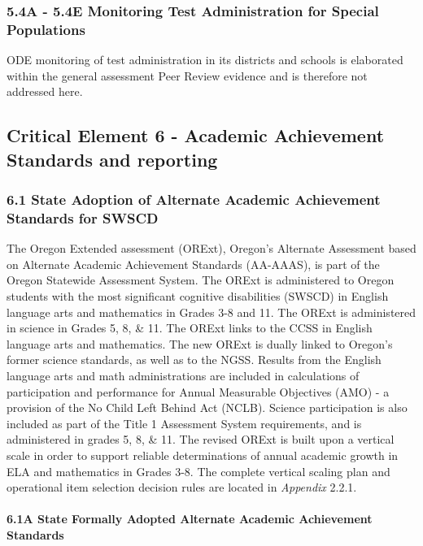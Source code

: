 \documentclass[]{article}
\let\oldparagraph\paragraph
\renewcommand{\paragraph}[1]{\oldparagraph{#1}\mbox{}}
\begin{document}
\subsubsection{5.4A - 5.4E Monitoring Test Administration for Special
Populations}\label{a---5.4e-monitoring-test-administration-for-special-populations}

ODE monitoring of test administration in its districts and schools is
elaborated within the general assessment Peer Review evidence and is
therefore not addressed here.

\subsection{Critical Element 6 - Academic Achievement Standards and
reporting}\label{critical-element-6---academic-achievement-standards-and-reporting}

\subsubsection{6.1 State Adoption of Alternate Academic Achievement
Standards for
SWSCD}\label{state-adoption-of-alternate-academic-achievement-standards-for-swscd}

The Oregon Extended assessment (ORExt), Oregon's Alternate Assessment
based on Alternate Academic Achievement Standards (AA-AAAS), is part of
the Oregon Statewide Assessment System. The ORExt is administered to
Oregon students with the most significant cognitive disabilities (SWSCD)
in English language arts and mathematics in Grades 3-8 and 11. The ORExt
is administered in science in Grades 5, 8, \& 11. The ORExt links to the
CCSS in English language arts and mathematics. The new ORExt is dually
linked to Oregon's former science standards, as well as to the NGSS.
Results from the English language arts and math administrations are
included in calculations of participation and performance for Annual
Measurable Objectives (AMO) - a provision of the No Child Left Behind
Act (NCLB). Science participation is also included as part of the Title
1 Assessment System requirements, and is administered in grades 5, 8, \&
11. The revised ORExt is built upon a vertical scale in order to support
reliable determinations of annual academic growth in ELA and mathematics
in Grades 3-8. The complete vertical scaling plan and operational item
selection decision rules are located in \emph{Appendix} 2.2.1.

\paragraph{6.1A State Formally Adopted Alternate Academic Achievement
Standards}\label{a-state-formally-adopted-alternate-academic-achievement-standards}
\end{document}
